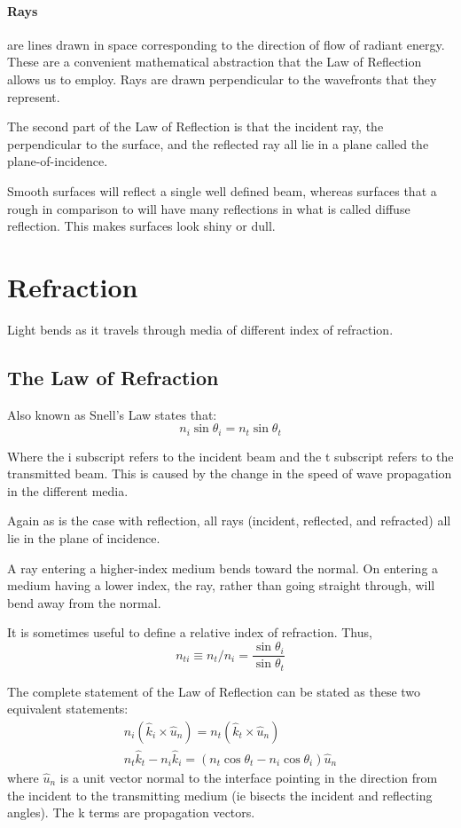 \documentclass[12pt]{report}
\begin{document}
\paragraph{Rays} are lines drawn in space corresponding to the direction of flow of radiant energy. These are a convenient mathematical abstraction that the Law of Reflection allows us to employ. Rays are drawn perpendicular to the wavefronts that they represent. 

The second part of the Law of Reflection is that the incident ray, the perpendicular to the surface, and the reflected ray all lie in a plane called the plane-of-incidence. 

Smooth surfaces will reflect a single well defined beam, whereas surfaces that a rough in comparison to \textlambda will have many reflections in what is called diffuse reflection. This makes surfaces look shiny or dull.

\section{Refraction}
Light bends as it travels through media of different index of refraction. 
\subsection{The Law of Refraction}
Also known as Snell's Law states that:
\begin{equation}
n_i\sin\theta_i = n_t\sin\theta_t
\end{equation}

Where the i subscript refers to the incident beam and the t subscript refers to the transmitted beam. This is caused by the change in the speed of wave propagation in the different media. 

Again as is the case with reflection, all rays (incident, reflected, and refracted) all lie in the plane of incidence. 

A ray entering a higher-index medium bends toward the normal. On entering a medium having a lower index, the ray, rather than going straight through, will bend away from the normal. 

It is sometimes useful to define a relative index of refraction. Thus, \[n_{ti} \equiv n_t/n_i = \frac{\sin\theta_i}{\sin\theta_t}\]

The complete statement of the Law of Reflection can be stated as these two equivalent statements:
\begin{equation}
\begin{array}{c}
n_i(\hat{k}_i \times \hat{u}_n) = n_t (\hat{k}_t \times \hat{u}_n) \\
n_t\hat{k}_t -n_i\hat{k}_i = (n_t\cos\theta_t - n_i\cos\theta_i) \hat{u}_n
\end{array}
\end{equation}
where $\hat{u}_n$ is a unit vector normal to the interface pointing in the direction from the incident to the transmitting medium (ie bisects the incident and reflecting angles). The k terms are propagation vectors. 
\end{document}
